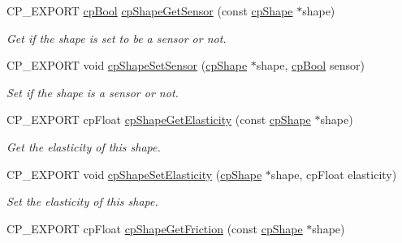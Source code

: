 \begin{DoxyCompactItemize}
\mbox{\label{group__cpShape_ga02d5d24afa5c5fbe529d3a1ff3bfb85d}} 
C\+P\+\_\+\+E\+X\+P\+O\+RT \hyperlink{group__basicTypes_gabc5e752c48f3449ca26ef413ecbd647e}{cp\+Bool} \hyperlink{group__cpShape_ga02d5d24afa5c5fbe529d3a1ff3bfb85d}{cp\+Shape\+Get\+Sensor} (const \hyperlink{structcpShape}{cp\+Shape} $\ast$shape)
\begin{DoxyCompactList}\small\item\em Get if the shape is set to be a sensor or not. \end{DoxyCompactList}\item 
\mbox{\label{group__cpShape_gad82e18c0a765300e42108c88caa3bbbb}} 
C\+P\+\_\+\+E\+X\+P\+O\+RT void \hyperlink{group__cpShape_gad82e18c0a765300e42108c88caa3bbbb}{cp\+Shape\+Set\+Sensor} (\hyperlink{structcpShape}{cp\+Shape} $\ast$shape, \hyperlink{group__basicTypes_gabc5e752c48f3449ca26ef413ecbd647e}{cp\+Bool} sensor)
\begin{DoxyCompactList}\small\item\em Set if the shape is a sensor or not. \end{DoxyCompactList}\item 
\mbox{\label{group__cpShape_ga2aca093a208084722c943a092f9735cb}} 
C\+P\+\_\+\+E\+X\+P\+O\+RT cp\+Float \hyperlink{group__cpShape_ga2aca093a208084722c943a092f9735cb}{cp\+Shape\+Get\+Elasticity} (const \hyperlink{structcpShape}{cp\+Shape} $\ast$shape)
\begin{DoxyCompactList}\small\item\em Get the elasticity of this shape. \end{DoxyCompactList}\item 
\mbox{\label{group__cpShape_ga746fd50b3e2b1d4deb25f2ecb2654028}} 
C\+P\+\_\+\+E\+X\+P\+O\+RT void \hyperlink{group__cpShape_ga746fd50b3e2b1d4deb25f2ecb2654028}{cp\+Shape\+Set\+Elasticity} (\hyperlink{structcpShape}{cp\+Shape} $\ast$shape, cp\+Float elasticity)
\begin{DoxyCompactList}\small\item\em Set the elasticity of this shape. \end{DoxyCompactList}\item 
\mbox{\label{group__cpShape_gae03dcb3f6221e41cf677eeca42aab280}} 
C\+P\+\_\+\+E\+X\+P\+O\+RT cp\+Float \hyperlink{group__cpShape_gae03dcb3f6221e41cf677eeca42aab280}{cp\+Shape\+Get\+Friction} (const \hyperlink{structcpShape}{cp\+Shape} $\ast$shape)

\end{DoxyCompactItemize}
